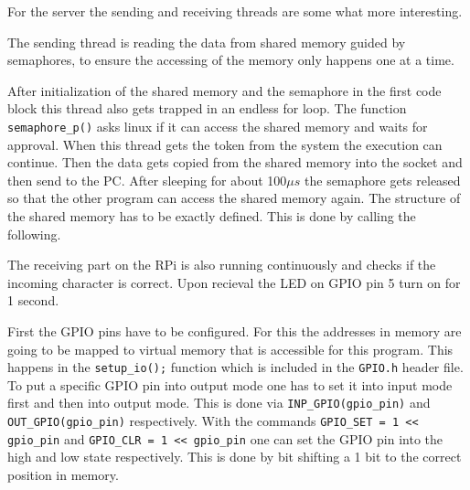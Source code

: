 \documentclass[12pt,paper=a4,twoside]{scrartcl}
\numberwithin{equation}{section}
\begin{document}
For the server the sending and receiving threads are some what more interesting.

The sending thread is reading the data from shared memory guided by semaphores, to ensure the accessing of the memory only happens one at a time.


After initialization of the shared memory and the semaphore in the first code block this thread also gets trapped in an endless for loop. The function \verb+semaphore_p()+ asks linux if it can access the shared memory and waits for approval. When this thread gets the token from the system the execution can continue. Then the data gets copied from the shared memory into the socket and then send to the PC. After sleeping for about 100$\mu s$ the semaphore gets released so that the other program can access the shared memory again.
The structure of the shared memory has to be exactly defined. This is done by calling the following.


The receiving part on the RPi is also running continuously and checks if the incoming character is correct. Upon recieval the LED on GPIO pin 5 turn on for 1 second.

First the GPIO pins have to be configured. For this the addresses in memory are going to be mapped to virtual memory that is accessible for this program. This happens in the \verb+setup_io();+ function which is included in the \verb+GPIO.h+ header file. To put a specific GPIO pin into output mode one has to set it into input mode first and then into output mode. This is done via \verb+INP_GPIO(gpio_pin)+ and \verb+OUT_GPIO(gpio_pin)+ respectively. With the commands \verb+GPIO_SET = 1 << gpio_pin+ and \verb+GPIO_CLR = 1 << gpio_pin+ one can set the GPIO pin into the high and low state respectively. This is done by bit shifting a 1 bit to the correct position in memory.
\end{document}
